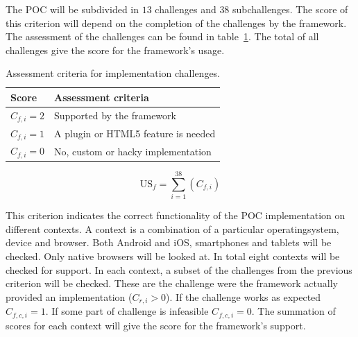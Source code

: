 \documentclass[a4paper]{artikel3}
\newcommand{\setspace}[0]{\vspace{2mm}}
\renewcommand{\paragraph}[1]{\setspace \noindent {\bf #1}  }
\begin{document}

\paragraph{Usage}
The POC will be subdivided in $13$ challenges and $38$ subchallenges.  
The score of this criterion will depend on the completion of the challenges by the framework.  
The assessment of the challenges can be found in table~\ref{table:challenges-scores}.  
The total of all challenges give the score for the framework's usage.

\begin{table}[h]	
\centering
\begin{tabular}{ll}
\toprule
\textbf{Score} & \textbf{Assessment criteria}\\
\midrule
$C_{f,i} = 2$ & Supported by the framework\\
$C_{f,i} = 1$ & A plugin or HTML5 feature is needed\\
$C_{f,i} = 0$ & No, custom or hacky implementation\\
\bottomrule
\end{tabular}
\caption{Assessment criteria for implementation challenges.}
\label{table:challenges-scores}
\end{table}

\begin{equation}
  \text{US}_f = \sum_{i=1}^{38}{\left(C_{f,i}\right)}
  \label{eq:gebruik}
\end{equation}

\paragraph{Support}
This criterion indicates the correct functionality of the POC implementation on different contexts.
A context is a combination of a particular operatingsystem, device and browser.
Both Android and iOS, smartphones and tablets will be checked.
Only native browsers will be looked at.
In total eight contexts will be checked for support.
In each context,  a subset of the challenges from the previous criterion will be checked.  
These are the challenge were the framework actually provided an implementation ($C_{r,i} > 0$).
If the challenge works as expected $C_{f,c,i} = 1$.
If some part of challenge is infeasible $C_{f,c,i} = 0$.
The summation of scores for each context will give the score for the framework's support.
\end{document}
